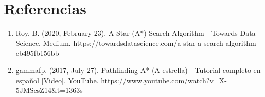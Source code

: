 \documentclass[11pt]{article}
\makeatletter
\providecommand{\tightlist}{%
      \setlength{\itemsep}{0pt}\setlength{\parskip}{0pt}}
\newcommand{\boxspacing}{\kern\kvtcb@left@rule\kern\kvtcb@boxsep}
\newcommand{\prompt}[4]{
        {\ttfamily\llap{{\color{#2}[#3]:\hspace{3pt}#4}}\vspace{-\baselineskip}}
    }
\makeatother
\begin{document}
    \hypertarget{referencias}{%
\section{Referencias}\label{referencias}}

\begin{enumerate}
\def\labelenumi{\arabic{enumi}.}
\tightlist
\item
  Roy, B. (2020, February 23). A-Star (A*) Search Algorithm - Towards
  Data Science. Medium.
  https://towardsdatascience.com/a-star-a-search-algorithm-eb495fb156bb
\item
  gammafp. (2017, July 27). Pathfinding A* (A estrella) - Tutorial
  completo en español {[}Video{]}. YouTube.
  https://www.youtube.com/watch?v=X-5JMScsZ14\&t=1363s
\end{enumerate}

    \begin{tcolorbox}[breakable, size=fbox, boxrule=1pt, pad at break*=1mm,colback=cellbackground, colframe=cellborder]
\prompt{In}{incolor}{ }{\boxspacing}
\begin{Verbatim}[commandchars=\\\{\}]

\end{Verbatim}
\end{tcolorbox}


    
    
    
\end{document}
